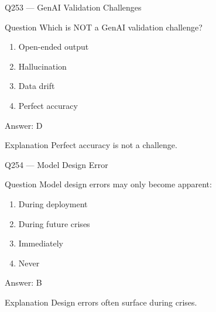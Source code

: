 \documentclass[aspectratio=169,8pt]{beamer}
\begin{document}
								\begin{frame}{Q253 --- GenAI Validation Challenges}
									\begin{block}{Question}
										Which is NOT a GenAI validation challenge?
										\begin{enumerate}
											\item Open-ended output
											\item Hallucination
											\item Data drift
											\item Perfect accuracy
										\end{enumerate}
									\end{block}
									\begin{exampleblock}{Answer: D}\end{exampleblock}
									\begin{block}{Explanation}
										Perfect accuracy is not a challenge.
									\end{block}
								\end{frame}
								
								\begin{frame}{Q254 --- Model Design Error}
									\begin{block}{Question}
										Model design errors may only become apparent:
										\begin{enumerate}
											\item During deployment
											\item During future crises
											\item Immediately
											\item Never
										\end{enumerate}
									\end{block}
									\begin{exampleblock}{Answer: B}\end{exampleblock}
									\begin{block}{Explanation}
										Design errors often surface during crises.
									\end{block}
								\end{frame}
								
\end{document}
